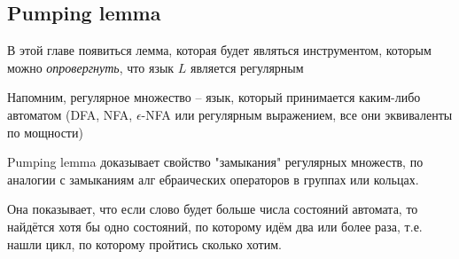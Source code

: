 \documentclass[5pt]{article}
\begin{document}
\subsection{Pumping lemma}

В этой главе появиться лемма, которая будет являться инструментом, которым можно \textit{опровергнуть}, что язык $L$ является регулярным

Напомним, регулярное множество -- язык, который принимается каким-либо автоматом (DFA, NFA, $\epsilon$-NFA или регулярным выражением, все они эквиваленты по мощности)

Pumping lemma доказывает свойство "замыкания" регулярных множеств, по аналогии с замыканиям алг
ебраических операторов в группах или кольцах.

Она показывает, что если слово будет больше числа состояний автомата, то найдётся хотя бы одно состояний, по которому идём два или более раза, т.е. нашли цикл, по которому пройтись сколько хотим.
\end{document}
